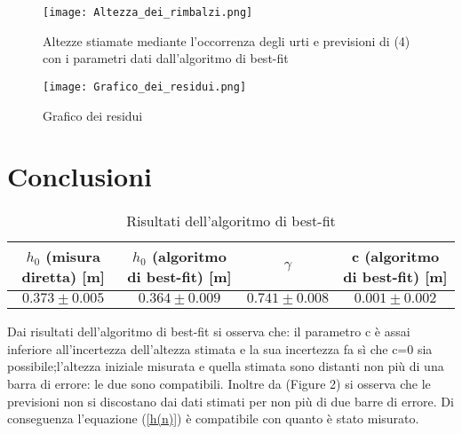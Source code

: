 \documentclass{article}
\begin{document}
\begin{figure}
	\texttt{[image: Altezza\_dei\_rimbalzi.png]}
		\caption{Altezze stiamate mediante l'occorrenza degli urti e previsioni di (4) con i parametri dati dall'algoritmo di best-fit}

\end{figure}
\begin{figure}
	\texttt{[image: Grafico\_dei\_residui.png]}
		\caption{Grafico dei residui}

\end{figure}


\section{Conclusioni}

\begin{table}
\begin{tabular}{|c|c|c|c|}
\hline
		$h_{0}$ (misura diretta) [m]& $h_{0}$ (algoritmo di best-fit) [m]& $\gamma$ &c (algoritmo di best-fit) [m]\\
\hline
		$0.373\pm0.005$ & $0.364\pm0.009$ & $0.741\pm0.008$ & $0.001\pm0.002$\\
\hline

	
\end{tabular}
	\caption{Risultati dell'algoritmo di best-fit}
\end{table}
Dai risultati dell'algoritmo di best-fit si osserva che: il parametro c è assai inferiore all'incertezza dell'altezza stimata e la sua incertezza fa sì che c=0 sia possibile;l'altezza iniziale misurata e quella stimata sono distanti non più di una barra di errore: le due sono compatibili.
Inoltre  da (Figure 2) si osserva che le previsioni non si discostano dai dati stimati per non più di due barre di errore.
Di conseguenza l'equazione (\ref{h(n)}) è compatibile con quanto è stato misurato.
\end{document}
